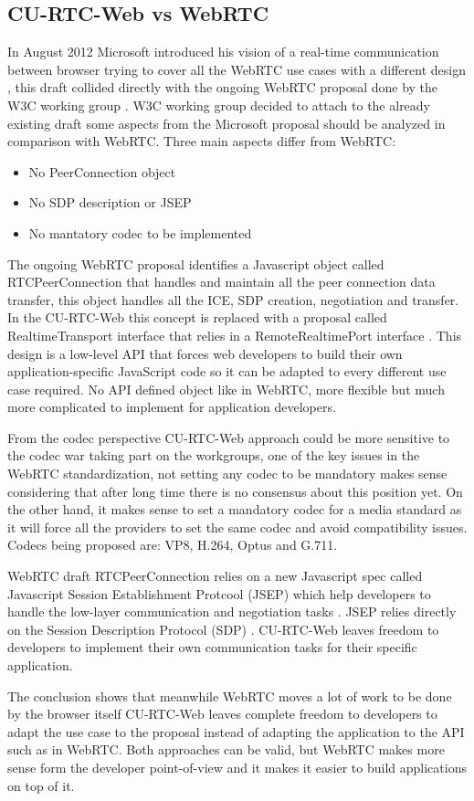 \subsection{CU-RTC-Web vs WebRTC}
In August 2012 Microsoft introduced his vision of a real-time communication between browser trying to cover all the WebRTC use cases with a different design \cite{curtcweb}, this draft collided directly with the ongoing WebRTC proposal done by the W3C working group \cite{webrtcW3cgroup}. W3C working group decided to attach to the already existing draft some aspects from the Microsoft proposal should be analyzed in comparison with WebRTC. Three main aspects differ from WebRTC:
\begin{itemize}
	\item No PeerConnection object
	\item No SDP description or JSEP
	\item No mantatory codec to be implemented
\end{itemize}
The ongoing WebRTC proposal identifies a Javascript object called RTCPeerConnection that handles and maintain all the peer connection data transfer, this object handles all the ICE, SDP creation, negotiation and transfer. In the CU-RTC-Web this concept is replaced with a proposal called RealtimeTransport interface that relies in a RemoteRealtimePort interface \cite{realtimemedia}. This design is a low-level API that forces web developers to build their own application-specific JavaScript code so it can be adapted to every different use case required. No API defined object like in WebRTC, more flexible but much more complicated to implement for application developers.

From the codec perspective CU-RTC-Web approach could be more sensitive to the codec war taking part on the workgroups, one of the key issues in the WebRTC standardization, not setting any codec to be mandatory makes sense considering that after long time there is no consensus about this position yet. On the other hand, it makes sense to set a mandatory codec for a media standard as it will force all the providers to set the same codec and avoid compatibility issues. Codecs being proposed are: VP8, H.264, Optus and G.711.

WebRTC draft RTCPeerConnection relies on a new Javascript spec called Javascript Session Establishment Protcool (JSEP) which help developers to handle the low-layer communication and negotiation tasks \cite{jsepIETF}. JSEP relies directly on the Session Description Protocol (SDP) \cite{sdpIETF}. CU-RTC-Web leaves freedom to developers to implement their own communication tasks for their specific application.

The conclusion shows that meanwhile WebRTC moves a lot of work to be done by the browser itself CU-RTC-Web leaves complete freedom to developers to adapt the use case to the proposal instead of adapting the application to the API such as in WebRTC. Both approaches can be valid, but WebRTC makes more sense form the developer point-of-view and it makes it easier to build applications on top of it.

